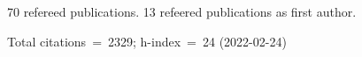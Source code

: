 70 refereed publications. 13 refeered publications as first author.

Total citations~=~2329; h-index~=~24 (2022-02-24)